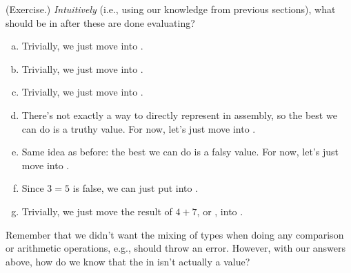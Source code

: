 \documentclass[letterpaper]{article}
\begin{document}
\begin{mdframed}
    (Exercise.) \emph{Intuitively} (i.e., using our knowledge from previous sections), what should be in  after these are done evaluating? 

    \begin{enumerate}[a.]
        \item {}
        \begin{mdframed}
            Trivially, we just move  into .
        \end{mdframed}

        \item {}
        \begin{mdframed}
            Trivially, we just move  into .
        \end{mdframed}

        \item {}
        \begin{mdframed}
            Trivially, we just move  into .
        \end{mdframed}

        \item {}
        \begin{mdframed}
            There's not exactly a way to directly represent  in assembly, so the best we can do is a truthy value. For now, let's just move  into .
        \end{mdframed}

        \item {}
        \begin{mdframed}
            Same idea as before: the best we can do is a falsy value. For now, let's just move  into .
        \end{mdframed}

        \item {}
        \begin{mdframed}
            Since $3 = 5$ is false, we can just put  into .
        \end{mdframed}

        \item {}
        \begin{mdframed}
            Trivially, we just move the result of $4 + 7$, or , into .
        \end{mdframed}
    \end{enumerate}
\end{mdframed}
Remember that we didn't want the mixing of types when doing any comparison or arithmetic operations, e.g.,  should throw an error. However, with our answers above, how do we know that the  in  isn't actually a  value? 
\end{document}
